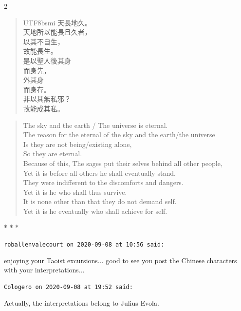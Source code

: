 \begin{paracol}{2}
\begin{verse}
\begin{CJK*}{UTF8}{bsmi}
天長地久。\\
天地所以能長且久者，\\
以其不自生，\\
故能長生。\\
是以聖人後其身\\
而身先，\\
外其身\\
而身存。\\
非以其無私邪？\\
故能成其私。
\end{CJK*}
\end{verse}
\switchcolumn
\begin{verse}
The sky and the earth / The universe is eternal.\\
The reason for the eternal of the sky and the earth/the universe\\
Is they are not being/existing alone,\\
So they are eternal.\\
Because of this, The sages put their selves behind all other people,\\
Yet it is before all others he shall eventually stand.\\
They were indifferent to the discomforts and dangers.\\
Yet it is he who shall thus survive.\\
It is none other than that they do not demand self.\\
Yet it is he eventually who shall achieve for self.
\end{verse}
\end{paracol}


\begin{center}* * *\end{center}

\begin{footnotesize}
\begin{sffamily}
\texttt{roballenvalecourt on 2020-09-08 at 10:56 said:}

enjoying your Taoist excursions... good to see you post the Chinese characters with your interpretations... 

\hfill

\texttt{Cologero on 2020-09-08 at 19:52 said:}

Actually, the interpretations belong to Julius Evola.


\hfill

\end{sffamily}
\end{footnotesize}

